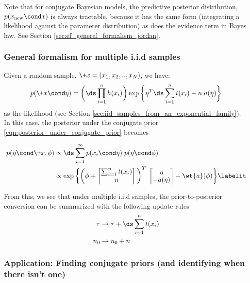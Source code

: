 \begin{remark}
Note that for conjugate Bayesian models, the predictive posterior distribution, $p(x_{\text{new}} \cond x)$ is always tractable, because it has the same form (integrating a likelihood against the parameter distribution) as does the evidence term in Bayes law.   See Section \ref{sec:ef_general_formalism_jordan}.
\end{remark}

\subsubsection{General formalism for multiple i.i.d samples} Given a random sample, $\+x=(x_1, x_2, .., x_N)$, we have:
\[ p(\+x \cond \eta) = \bigg( \ds\prod_{i=1}^n h(x_i)  \bigg) \exp \bigg\{ \eta^T  \ds\sum_{i=1}^n t(x_i) - n \; a(\eta) \bigg\} \]
as the likelihood (see Section \ref{sec:iid_samples_from_an_exponential_family}). In this case, the posterior under the conjugate prior \eqref{eqn:posterior_under_conjugate_prior} becomes

\begin{align*}
p(\eta \cond \+x, \phi) & \propto \ds\sum_{i=1}^\infty p(x_i \cond \eta) \; p(\eta \cond \phi) \\
&\propto \exp \bigg\{ \bigg( \phi + 
\begin{bmatrix} 
\sum_{i=1}^n t(x_i) \\
n \\
\end{bmatrix} \bigg)^T \; 
\begin{bmatrix} 
\eta \\
-a(\eta)
\end{bmatrix} 
- \wt{a}(\phi)  \bigg\} 
\labelit \label{eqn:general_formalism_prior_to_posterior_conversion_after_multiple_iid_samples}
\end{align*}


From this, we see that under multiple i.i.d samples, the prior-to-posterior conversion can be summarized with the following update rules
\begin{subequations}
	\begin{align}
\tau & \to \tau + \ds\sum_{i=1}^n t(x_i) \\
n_0 & \to  n_0 + n 
\end{align} \label{eqn:general_formalism_prior_to_posterior_conversion}
\end{subequations}

\subsubsection{Application: Finding conjugate priors (and identifying when there isn't one)}

